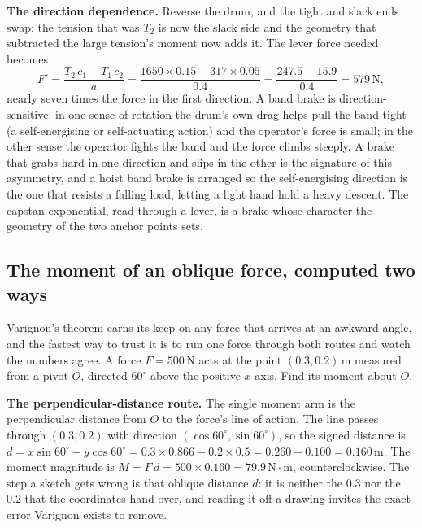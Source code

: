 \textbf{The direction dependence.} Reverse the drum, and the tight and slack
ends swap: the tension that was $T_2$ is now the slack side and the geometry
that subtracted the large tension's moment now adds it. The lever force needed
becomes
\[
F' = \frac{T_2\,c_1 - T_1\,c_2}{a}
= \frac{1650 \times 0.15 - 317 \times 0.05}{0.4}
= \frac{247.5 - 15.9}{0.4} = 579\,\text{N},
\]
nearly seven times the force in the first direction. A band brake is
direction-sensitive: in one sense of rotation the drum's own drag helps pull
the band tight (a self-energising or self-actuating action) and the operator's
force is small; in the other sense the operator fights the band and the force
climbs steeply. A brake that grabs hard in one direction and slips in the other
is the signature of this asymmetry, and a hoist band brake is arranged so the
self-energising direction is the one that resists a falling load, letting a
light hand hold a heavy descent. The capstan exponential, read through a lever,
is a brake whose character the geometry of the two anchor points sets.

\subsection{The moment of an oblique force, computed two ways}

Varignon's theorem earns its keep on any force that arrives at an awkward angle,
and the fastest way to trust it is to run one force through both routes and watch
the numbers agree. A force $F = 500\,\text{N}$ acts at the point $(0.3, 0.2)\,
\si{\meter}$ measured from a pivot $O$, directed $60^{\circ}$ above the positive
$x$ axis. Find its moment about $O$.

\textbf{The perpendicular-distance route.} The single moment arm is the
perpendicular distance from $O$ to the force's line of action. The line passes
through $(0.3, 0.2)$ with direction $(\cos 60^{\circ}, \sin 60^{\circ})$, so the
signed distance is $d = x\sin 60^{\circ} - y\cos 60^{\circ} = 0.3 \times 0.866 -
0.2 \times 0.5 = 0.260 - 0.100 = 0.160\,\si{\meter}$. The moment magnitude is
$M = F\,d = 500 \times 0.160 = 79.9\,\text{N}\cdot\text{m}$, counterclockwise.
The step a sketch gets wrong is that oblique distance $d$: it is neither the
$0.3$ nor the $0.2$ that the coordinates hand over, and reading it off a drawing
invites the exact error Varignon exists to remove.

